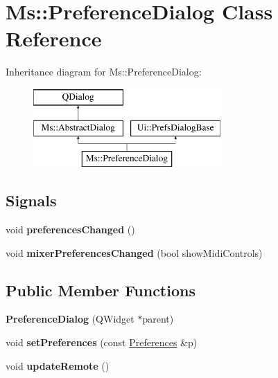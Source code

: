 \hypertarget{class_ms_1_1_preference_dialog}{}\section{Ms\+:\+:Preference\+Dialog Class Reference}
\label{class_ms_1_1_preference_dialog}
Inheritance diagram for Ms\+:\+:Preference\+Dialog\+:\begin{figure}[H]
\begin{center}
\leavevmode
\includegraphics[height=3.000000cm]{class_ms_1_1_preference_dialog}
\end{center}
\end{figure}
\subsection*{Signals}
\begin{DoxyCompactItemize}
\item 
\mbox{\label{class_ms_1_1_preference_dialog_a3341f030d7202af3ab33a8543118d43d}} 
void {\bfseries preferences\+Changed} ()
\item 
\mbox{\label{class_ms_1_1_preference_dialog_ab578248ce4878f9196991ac056128587}} 
void {\bfseries mixer\+Preferences\+Changed} (bool show\+Midi\+Controls)
\end{DoxyCompactItemize}
\subsection*{Public Member Functions}
\begin{DoxyCompactItemize}
\item 
\mbox{\label{class_ms_1_1_preference_dialog_ab5f2465bb70d526af55593e7f3842d39}} 
{\bfseries Preference\+Dialog} (Q\+Widget $\ast$parent)
\item 
\mbox{\label{class_ms_1_1_preference_dialog_a80dcceeb52c49f72c786f109363b31be}} 
void {\bfseries set\+Preferences} (const \hyperlink{struct_ms_1_1_preferences}{Preferences} \&p)
\item 
\mbox{\label{class_ms_1_1_preference_dialog_a8457d32011706195f9b0b9c19d10f11d}} 
void {\bfseries update\+Remote} ()
\end{DoxyCompactItemize}
